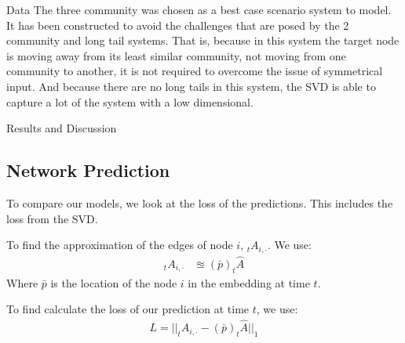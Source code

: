 \documentclass[12pt]{amsart}
\begin{document}
\begin{section}{Data}
    The three community was chosen as a best case scenario system to model. It has been constructed to avoid the challenges that are posed by the 2 community and long tail systems. That is, because in this system the target node is moving away from its least similar community, not moving from one community to another, it is not required to overcome the issue of symmetrical input. And because there are no long tails in this system, the SVD is able to capture a lot of the system with a low dimensional.

\end{section}

\begin{section}{Results and Discussion}
    \subsection{Network Prediction}
    To compare our models, we look at the loss of the predictions. This includes the loss from the SVD.
    
    To find the approximation of the edges of node $i$, $_tA_{i,\cdot}$. We use: 
    \begin{align}
        _tA_{i,\cdot} &\approxeq (\bar p) _t\hat A
    \end{align}
    Where $\bar p$ is the location of the node $i$ in the embedding at time $t$.

    To find calculate the loss of our prediction at time $t$, we use:
    \begin{align}
        L = ||_tA_{i,\cdot} - (\bar p) _t\hat A||_1
    \end{align}
    

\end{section}
\end{document}

